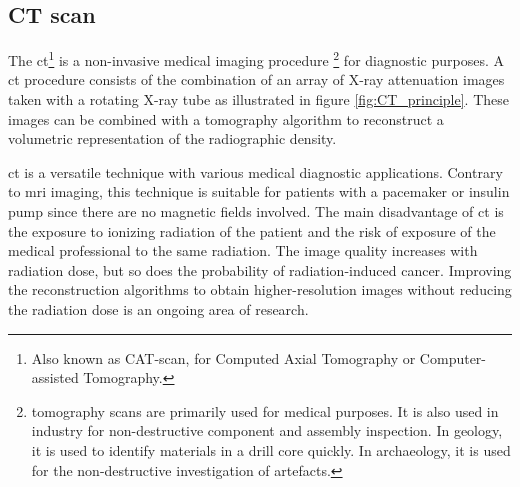 \subsection{CT scan}
\par{
    The \acrfull{ct}\footnote{Also known as CAT-scan, for Computed Axial Tomography or Computer-assisted Tomography.} is a non-invasive medical imaging procedure
    \footnote{\Gls{tomography} scans are primarily used for medical purposes. 
    It is also used in industry for non-destructive component and assembly inspection.
    In geology, it is used to identify materials in a drill core quickly. In archaeology, it is used for the non-destructive investigation of artefacts. } 
    for diagnostic purposes. 
    A \acrlong{ct} procedure consists of the combination of an array of X-ray attenuation images taken with a rotating X-ray tube as illustrated in figure \ref{fig:CT_principle}. 
    These images can be combined with a tomography algorithm to reconstruct a volumetric representation of the radiographic density.
}
\par{
    \acrshort{ct} is a versatile technique with various medical diagnostic applications. 
    Contrary to \acrfull{mri} imaging, this technique is suitable for patients with a pacemaker or insulin pump since there are no magnetic fields involved.
    The main disadvantage of \acrshort{ct} is the exposure to ionizing radiation of the patient and the risk of exposure of the medical professional to the same radiation.
    The image quality increases with radiation dose, but so does the probability of radiation-induced cancer.
    Improving the reconstruction algorithms to obtain higher-resolution images without reducing the radiation dose is an ongoing area of research. 
}

